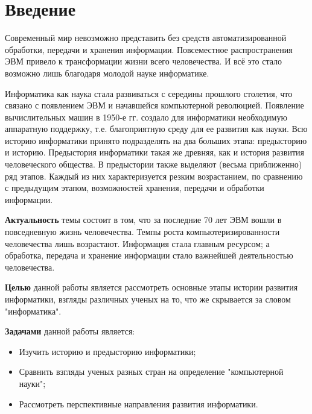 \chapter*{Введение}							%


Современный мир невозможно представить без средств автоматизированной обработки, передачи и хранения информации. Повсеместное распространения ЭВМ привело к трансформации жизни всего человечества. И всё это стало возможно лишь благодаря молодой науке информатике.

Информатика как наука стала развиваться с середины прошлого столетия, что связано с появлением ЭВМ и начавшейся компьютерной революцией. Появление вычислительных машин в 1950-е гг. создало для информатики необходимую аппаратную поддержку, т.е. благоприятную среду для ее развития как науки. Всю историю информатики принято подразделять на два больших этапа: предысторию и историю.
Предыстория информатики такая же древняя, как и история развития человеческого общества. В предыстории также выделяют (весьма приближенно) ряд этапов. Каждый из них характеризуется резким возрастанием, по сравнению с предыдущим этапом, возможностей хранения, передачи и обработки информации.


\textbf{Актуальность} темы состоит в том, что за последние 70 лет ЭВМ вошли  в повседневную жизнь человечества. Темпы роста компьютеризированности человечества лишь возрастают. Информация стала главным ресурсом; а обработка, передача и хранение информации стало  важнейшей деятельностью человечества.  

\textbf{Целью} данной работы является рассмотреть основные этапы истории развития информатики, взгляды различных ученых на то, что же скрывается за словом "информатика".

\textbf{Задачами} данной работы является:
\begin{itemize}
\item Изучить историю и предысторию информатики;
\item Сравнить взгляды ученых разных стран на определение "компьютерной науки";
\item Рассмотреть перспективные направления развития информатики.
\end{itemize}

\clearpage